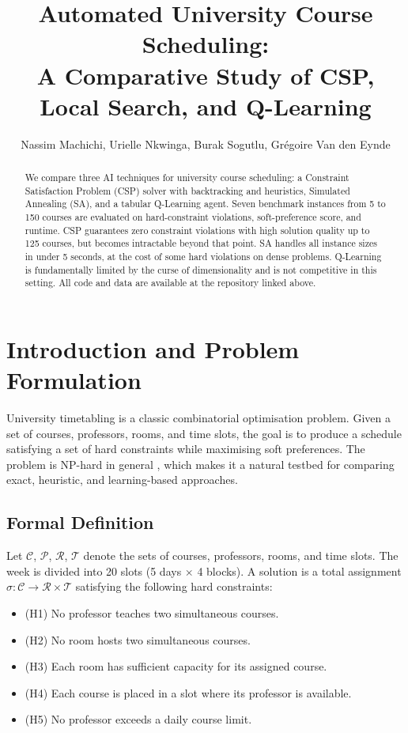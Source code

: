 \documentclass[letterpaper]{article}
\title{Automated University Course Scheduling:\\
A Comparative Study of CSP, Local Search, and Q-Learning}
\author{
    Nassim Machichi,
    Urielle Nkwinga,
    Burak Sogutlu,
    Gr\'{e}goire Van den Eynde
}
\begin{document}
\maketitle

\begin{abstract}
We compare three AI techniques for university course scheduling: a Constraint Satisfaction Problem (CSP) solver with backtracking and heuristics, Simulated Annealing (SA), and a tabular Q-Learning agent. Seven benchmark instances from 5 to 150 courses are evaluated on hard-constraint violations, soft-preference score, and runtime. CSP guarantees zero constraint violations with high solution quality up to 125 courses, but becomes intractable beyond that point. SA handles all instance sizes in under 5 seconds, at the cost of some hard violations on dense problems. Q-Learning is fundamentally limited by the curse of dimensionality and is not competitive in this setting. All code and data are available at the repository linked above.
\end{abstract}

\section{Introduction and Problem Formulation}

University timetabling is a classic combinatorial optimisation problem. Given a set of courses, professors, rooms, and time slots, the goal is to produce a schedule satisfying a set of hard constraints while maximising soft preferences. The problem is NP-hard in general \cite{russell2020}, which makes it a natural testbed for comparing exact, heuristic, and learning-based approaches.

\subsection{Formal Definition}

Let $\mathcal{C}$, $\mathcal{P}$, $\mathcal{R}$, $\mathcal{T}$ denote the sets of courses, professors, rooms, and time slots. The week is divided into 20 slots (5 days $\times$ 4 blocks). A solution is a total assignment $\sigma: \mathcal{C} \rightarrow \mathcal{R} \times \mathcal{T}$ satisfying the following hard constraints:
\begin{itemize}
    \item (H1) No professor teaches two simultaneous courses.
    \item (H2) No room hosts two simultaneous courses.
    \item (H3) Each room has sufficient capacity for its assigned course.
    \item (H4) Each course is placed in a slot where its professor is available.
    \item (H5) No professor exceeds a daily course limit.
\end{itemize}
\end{document}
